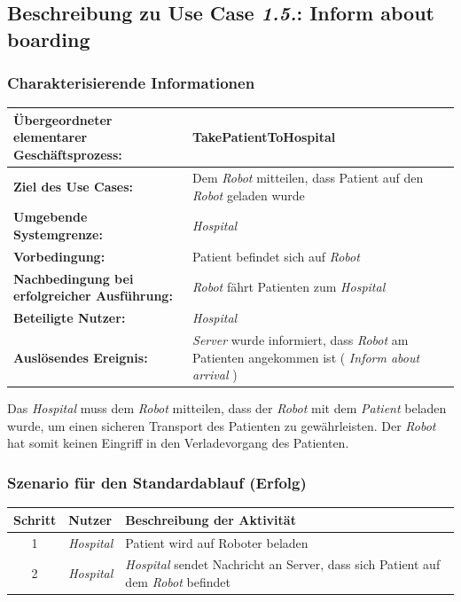 			\subsection*{Beschreibung zu Use Case \emph{1.5.}: Inform about boarding}
				\subsubsection*{Charakterisierende Informationen}
	
				\begin{table}[H]
					\centering
					\begin{tabularx}{\textwidth}{|p{5cm}|X|}
					\hline
					\textbf{Übergeordneter elementarer Geschäftsprozess:} & TakePatientToHospital   \\ \hline
					\textbf{Ziel des Use Cases:} & Dem \emph{Robot} mitteilen, dass Patient auf den \emph{Robot} geladen wurde \\ \hline
					\textbf{Umgebende Systemgrenze:} & \emph{Hospital} \\ \hline
					\textbf{Vorbedingung:} & Patient befindet sich auf \emph{Robot}\\ \hline
					\textbf{Nachbedingung bei erfolgreicher Ausführung:} & \emph{Robot} fährt Patienten zum \emph{Hospital} \\ \hline
					\textbf{Beteiligte Nutzer:} & \emph{Hospital}\\ \hline
					\textbf{Auslösendes Ereignis:} & \emph{Server} wurde informiert, dass \emph{Robot} am Patienten angekommen ist (\textit{ \glqq Inform about arrival \grqq }) \\
					\hline
					\end{tabularx}
				\end{table}
				
				Das \emph{Hospital} muss dem \emph{Robot} mitteilen, dass der \emph{Robot} mit dem \emph{Patient} beladen wurde, um einen sicheren Transport des Patienten zu gewährleisten. 
				Der \emph{Robot} hat somit keinen Eingriff in den Verladevorgang des Patienten.
	
				\subsubsection*{Szenario für den Standardablauf (Erfolg)}
	
				\begin{table}[H]
					\centering
					\begin{tabularx}{\textwidth}{|c|p{2cm}|X|}
					\hline
					Schritt & Nutzer & Beschreibung der Aktivität \\ \hline
					1 & \emph{Hospital} & Patient wird auf Roboter beladen \\
					2 & \emph{Hospital} & \emph{Hospital} sendet Nachricht an Server, dass sich Patient auf dem \emph{Robot} befindet \\
					\hline
					\end{tabularx}
				\end{table}
	
